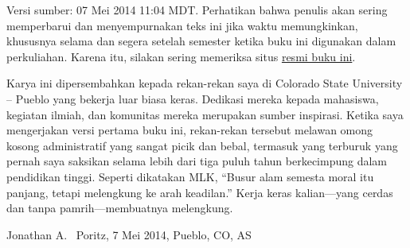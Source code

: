 \documentclass[12pt,letterpaper]{amsbook}
\theoremstyle{definition}
\theoremstyle{remark}
\numberwithin{figure}{section}
\numberwithin{exercise}{section}
\numberwithin{section}{chapter}
\numberwithin{equation}{section}
\numberwithin{table}{section}
\def\idtimestamp{07 Mei 2014 11:04 MDT}
\newenvironment{preface}{}{}
\begin{document}
\begin{preface}
Versi sumber: \idtimestamp. Perhatikan bahwa penulis akan sering memperbarui dan
menyempurnakan teks ini jika waktu memungkinkan, khususnya selama dan segera
setelah semester ketika buku ini digunakan dalam perkuliahan. Karena itu,
silakan sering memeriksa situs
  \href{https://www.poritz.net/jonathan/share/yaintt/}{resmi buku ini}.

Karya ini dipersembahkan kepada rekan-rekan saya di Colorado State University
-- Pueblo yang bekerja luar biasa keras. Dedikasi mereka kepada mahasiswa,
kegiatan ilmiah, dan komunitas mereka merupakan sumber inspirasi. Ketika saya
mengerjakan versi pertama buku ini, rekan-rekan tersebut melawan omong kosong
administratif yang sangat picik dan bebal, termasuk yang terburuk
yang pernah saya saksikan selama lebih dari tiga puluh tahun berkecimpung dalam
pendidikan tinggi. Seperti dikatakan MLK, ``Busur alam semesta moral itu
panjang, tetapi melengkung ke arah keadilan.'' Kerja keras kalian---yang cerdas
dan tanpa pamrih---membuatnya melengkung.

\vskip2mm
\hfill Jonathan A.~ Poritz, 7 Mei 2014, Pueblo, CO, AS
\end{preface}
\end{document}
